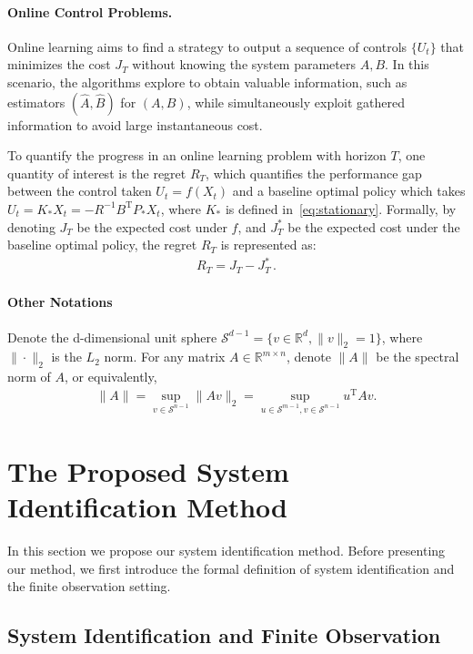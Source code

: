 \documentclass{article}
\theoremstyle{definition}
\begin{document}
\paragraph{Online Control Problems.} Online learning aims to find a strategy to output a sequence of controls $\{U_t\}$  that minimizes the cost $J_{T}$ without knowing the system parameters $A, B$. In this scenario, the algorithms explore to obtain valuable information, such as estimators $(\hat{A},\hat{B})$ for $(A,B)$, while simultaneously exploit gathered information to avoid large instantaneous cost.

To quantify the progress in an online learning problem with horizon $T$, one quantity of interest is the regret $R_{T}$, which quantifies the performance gap between the control taken $U_t = f(X_t)$ and a baseline optimal policy which takes $U_{t} = K_{*}X_{t} =-R^{-1}B^{\mathrm{T}}P_{*}X_{t}$, where $K_*$ is defined in~\eqref{eq:stationary}. Formally, by denoting $J_{T}$ be the expected cost under $f$, and $J^{*}_{T}$ be the expected cost under the baseline optimal policy, the regret $R_{T}$ is represented as:
\begin{align}\label{expression:regret}
R_{T}=J_{T}-J^{*}_{T}\,.
\end{align}

\paragraph{Other Notations} 
Denote the d-dimensional unit sphere $\mathcal{S}^{d-1}=\{v\in \mathbb{R}^{d},\|v\|_{2}=1\}$, where $\|\cdot\|_{2}$ is the $L_{2}$ norm.
For any matrix $A\in \mathbb{R}^{m\times n}$, denote $\|A\|$ be the spectral norm of $A$, or equivalently, 
\begin{align*}
\|A\|=\sup_{v\in \mathcal{S}^{n-1}}\|Av\|_{2}=\sup_{u\in \mathcal{S}^{m-1},v\in \mathcal{S}^{n-1}}u^{\mathrm{T}}Av.
\end{align*}




\section{The Proposed System Identification Method}
In this section we propose our system identification method. Before presenting our method, we first introduce the formal definition of system identification and the finite observation setting.

\subsection{System Identification and Finite Observation}
\end{document}
